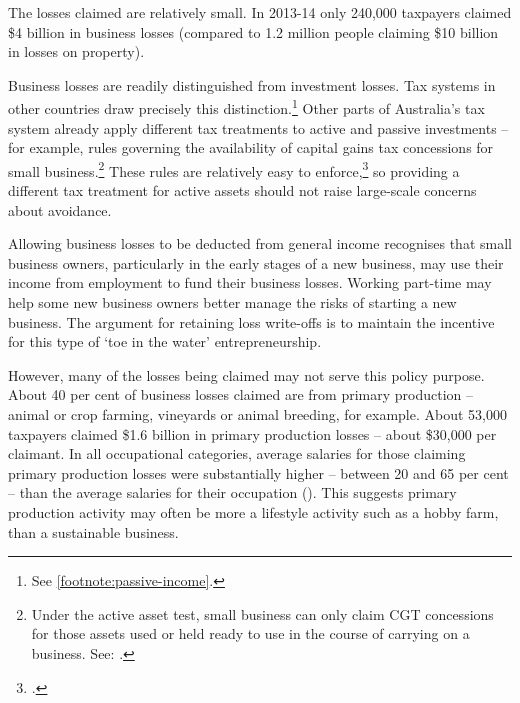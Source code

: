 The losses claimed are relatively small. In 2013-14 only 240,000 taxpayers claimed \$4 billion in business losses (compared to 1.2 million people claiming \$10 billion in losses on property).\label{insec:number-taxpayers-claiming-business-losses}

Business losses are readily distinguished from investment losses. Tax systems in other countries draw precisely this distinction.\footnote{See \stopifendnote{}\vref{footnote:passive-income}.} Other parts of Australia’s tax system already apply different tax treatments to active and passive investments – for example, rules governing the availability of capital gains tax concessions for small business.\footnote{Under the active asset test, small business can only claim CGT concessions for those assets used or held ready to use in the course of carrying on a business. See: \textcite{ATO2015ActiveAssetTest}.} These rules are relatively easy to enforce,\footcite{Mather2016} so providing a different tax treatment for active assets should not raise large-scale concerns about avoidance. 

Allowing business losses to be deducted from general income recognises that small business owners, particularly in the early stages of a new business, may use their income from employment to fund their business losses. Working part-time may help some new business owners better manage the risks of starting a new business. The argument for retaining loss write-offs is to maintain the incentive for this type of ‘toe in the water’ entrepreneurship. 

However, many of the losses being claimed may not serve this policy purpose. About 40 per cent of business losses claimed are from primary production – animal or crop farming, vineyards or animal breeding, for example. About 53,000 taxpayers claimed \$1.6 billion in primary production losses – about \$30,000 per claimant. In all occupational categories, average salaries for those claiming primary production losses were substantially higher – between 20 and 65 per cent – than the average salaries for their occupation (). This suggests primary production activity may often be more a lifestyle activity such as a hobby farm, than a sustainable business.

